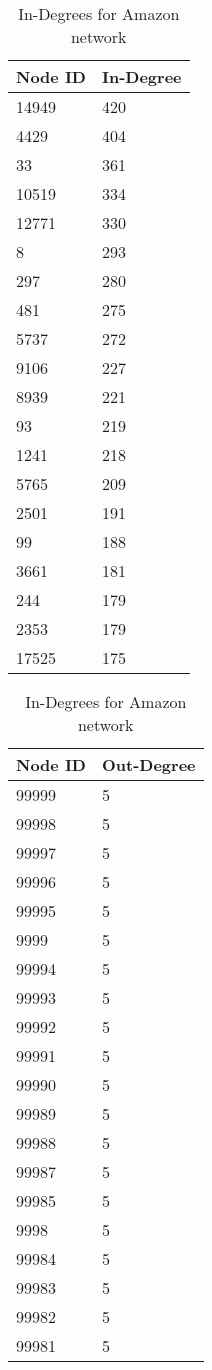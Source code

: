 \begin{table}[htbp]%
\centering
\begin{tabular}{|l|l|}
\hline
Node ID & In-Degree \\
\hline
14949 & 420 \\
4429 & 404 \\
33 & 361 \\
10519 & 334 \\
12771 & 330 \\
8 & 293 \\
297 & 280 \\
481 & 275 \\
5737 & 272 \\
9106 & 227 \\
8939 & 221 \\
93 & 219 \\
1241 & 218 \\
5765 & 209 \\
2501 & 191 \\
99 & 188 \\
3661 & 181 \\
244 & 179 \\
2353 & 179 \\
17525 & 175 \\
\hline
\end{tabular}
\caption{In-Degrees for Amazon network}
\label{tab:amazonin}
\end{table}

\begin{table}[htbp]%
\centering
\begin{tabular}{|l|l|}
\hline
Node ID & Out-Degree \\
\hline
99999 & 5 \\
99998 & 5 \\
99997 & 5 \\
99996 & 5 \\
99995 & 5 \\
9999 & 5 \\
99994 & 5 \\
99993 & 5 \\
99992 & 5 \\
99991 & 5 \\
99990 & 5 \\
99989 & 5 \\
99988 & 5 \\
99987 & 5 \\
99985 & 5 \\
9998 & 5 \\
99984 & 5 \\
99983 & 5 \\
99982 & 5 \\
99981 & 5 \\
\hline
\end{tabular}
\caption{In-Degrees for Amazon network}
\label{tab:amazonout}
\end{table}


